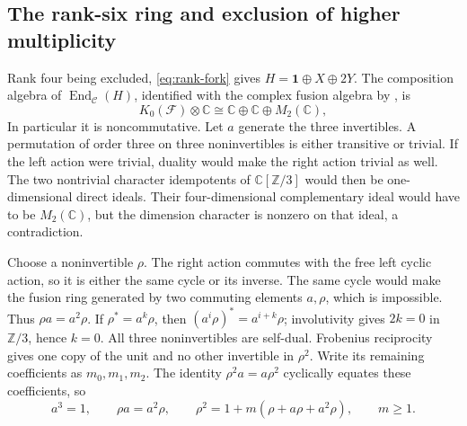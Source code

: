 \subsection{The rank-six ring and exclusion of higher multiplicity}

Rank four being excluded, \eqref{eq:rank-fork} gives
$H=\mathbf1\oplus X\oplus2Y$. The composition algebra of
$\operatorname{End}_{\mathcal C}(H)$, identified with the complex
fusion algebra by \cite[Corollary~3.4]{BJ}, is
\[
 K_0(\mathcal F)\otimes\mathbb C
 \cong\mathbb C\oplus\mathbb C\oplus M_2(\mathbb C),
\]
In particular it is noncommutative. Let $a$ generate the three
invertibles. A permutation of order three on three noninvertibles
is either transitive or trivial. If the left action were trivial,
duality would make the right action trivial as well. The two nontrivial
character idempotents of $\mathbb C[\mathbb Z/3]$ would then be
one-dimensional direct ideals. Their four-dimensional complementary
ideal would have to be $M_2(\mathbb C)$, but the dimension character
is nonzero on that ideal, a contradiction.

Choose a noninvertible $\rho$. The right action commutes with the free
left cyclic action, so it is either the same cycle or its inverse.
The same cycle would make the fusion ring generated by two commuting
elements $a,\rho$, which is impossible. Thus $\rho a=a^2\rho$.
If $\rho^*=a^k\rho$, then
$(a^i\rho)^*=a^{i+k}\rho$; involutivity gives $2k=0$ in
$\mathbb Z/3$, hence $k=0$. All three noninvertibles are self-dual.
Frobenius reciprocity gives one copy of the unit and no other
invertible in $\rho^2$. Write its remaining coefficients as
$m_0,m_1,m_2$. The identity $\rho^2a=a\rho^2$ cyclically equates
these coefficients, so
\begin{equation}
 a^3=1,\qquad\rho a=a^2\rho,\qquad
 \rho^2=1+m(\rho+a\rho+a^2\rho),\qquad m\ge1.
 \label{eq:rank6-ring}
\end{equation}

